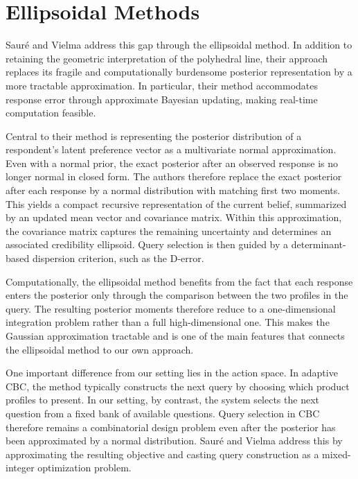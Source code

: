 \documentclass{article}
\begin{document}
\section{Ellipsoidal Methods}

Saur\'e and Vielma \cite{ellipsoidal} address this gap through the
ellipsoidal method. In addition to retaining the geometric interpretation of the
polyhedral line, their approach replaces its fragile and computationally burdensome
posterior representation by a more tractable approximation. In particular, their
method accommodates response error through approximate Bayesian updating, making
real-time computation feasible.

Central to their method is representing the posterior
distribution of a respondent's latent preference vector as a multivariate normal approximation. Even with a
normal prior, the exact posterior after an observed response is no longer normal in
closed form. The authors therefore replace the exact posterior after each
response by a normal distribution with matching first two moments. This yields a
compact recursive representation of the current belief, summarized by
an updated mean vector and covariance matrix. Within this approximation, the
covariance matrix captures the remaining uncertainty and determines an associated
credibility ellipsoid. Query selection is then guided by a determinant-based
dispersion criterion, such as the D-error.


Computationally, the ellipsoidal method benefits from the fact that each response
enters the posterior only through the comparison between the two profiles in the
query. The resulting posterior moments therefore reduce to a one-dimensional
integration problem rather than a full high-dimensional one. This makes the
Gaussian approximation tractable and is one of the main features that connects the
ellipsoidal method to our own approach.


One important
difference from our setting lies in the action space. In adaptive CBC, the method
typically constructs the next query by choosing which product profiles to present. In our setting, by contrast, the system
selects the next question from a fixed bank of available questions.  Query selection in CBC therefore
remains a combinatorial design problem even after the posterior has been
approximated by a normal distribution. Saur\'e and Vielma address this by
approximating the resulting objective and casting query construction as a
mixed-integer optimization problem.
\end{document}
